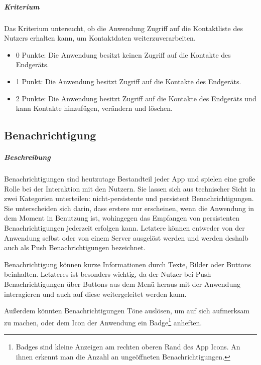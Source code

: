 \subparagraph{Kriterium\\}
Das Kriterium untersucht, ob die Anwendung Zugriff auf die Kontaktliste des Nutzers erhalten kann, um Kontaktdaten weiterzuverarbeiten.

\begin{itemize}
\item 0 Punkte: Die Anwendung besitzt keinen Zugriff auf die Kontakte des Endgeräts.
\item 1 Punkt: Die Anwendung besitzt Zugriff auf die Kontakte des Endgeräts.
\item 2 Punkte: Die Anwendung besitzt Zugriff auf die Kontakte des Endgeräts und kann Kontakte hinzufügen, verändern und löschen.
\end{itemize}

\subsection{Benachrichtigung}
\subparagraph{Beschreibung\\}
Benachrichtigungen sind heutzutage Bestandteil jeder App und spielen eine große Rolle bei der Interaktion mit den Nutzern.
Sie lassen sich aus technischer Sicht in zwei Kategorien unterteilen: nicht-persistente und persistent Benachrichtigungen.
Sie unterscheiden sich darin, dass erstere nur erscheinen, wenn die Anwendung in dem Moment in Benutzung ist, wohingegen das Empfangen von persistenten Benachrichtigungen jederzeit erfolgen kann.
Letztere können entweder von der Anwendung selbst oder von einem Server ausgelöst werden und werden deshalb auch als Push Benachrichtigungen bezeichnet.


Benachrichtigung können kurze Informationen durch Texte, Bilder oder Buttons beinhalten.
Letzteres ist besonders wichtig, da der Nutzer bei Push Benachrichtigungen über Buttons aus dem Menü heraus mit der Anwendung interagieren und auch auf diese weitergeleitet werden kann.

Außerdem könnten Benachrichtigungen Töne auslösen, um auf sich aufmerksam zu machen, oder dem Icon der Anwendung ein Badge\footnote{Badges sind kleine Anzeigen am rechten oberen Rand des App Icons. An ihnen erkennt man die Anzahl an ungeöffneten Benachrichtigungen.} anheften.

